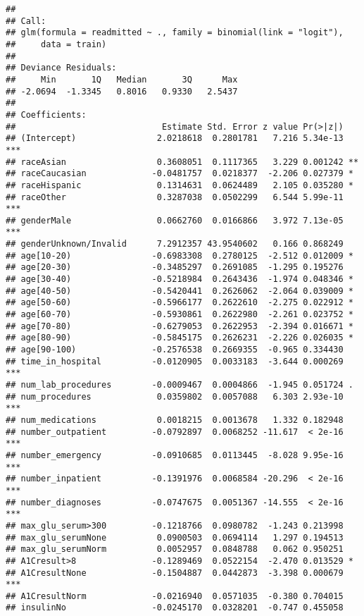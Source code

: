 \documentclass[]{article}
\begin{document}
\begin{verbatim}
## 
## Call:
## glm(formula = readmitted ~ ., family = binomial(link = "logit"), 
##     data = train)
## 
## Deviance Residuals: 
##     Min       1Q   Median       3Q      Max  
## -2.0694  -1.3345   0.8016   0.9330   2.5437  
## 
## Coefficients:
##                             Estimate Std. Error z value Pr(>|z|)    
## (Intercept)                2.0218618  0.2801781   7.216 5.34e-13 ***
## raceAsian                  0.3608051  0.1117365   3.229 0.001242 ** 
## raceCaucasian             -0.0481757  0.0218377  -2.206 0.027379 *  
## raceHispanic               0.1314631  0.0624489   2.105 0.035280 *  
## raceOther                  0.3287038  0.0502299   6.544 5.99e-11 ***
## genderMale                 0.0662760  0.0166866   3.972 7.13e-05 ***
## genderUnknown/Invalid      7.2912357 43.9540602   0.166 0.868249    
## age[10-20)                -0.6983308  0.2780125  -2.512 0.012009 *  
## age[20-30)                -0.3485297  0.2691085  -1.295 0.195276    
## age[30-40)                -0.5218984  0.2643436  -1.974 0.048346 *  
## age[40-50)                -0.5420441  0.2626062  -2.064 0.039009 *  
## age[50-60)                -0.5966177  0.2622610  -2.275 0.022912 *  
## age[60-70)                -0.5930861  0.2622980  -2.261 0.023752 *  
## age[70-80)                -0.6279053  0.2622953  -2.394 0.016671 *  
## age[80-90)                -0.5845175  0.2626231  -2.226 0.026035 *  
## age[90-100)               -0.2576538  0.2669355  -0.965 0.334430    
## time_in_hospital          -0.0120905  0.0033183  -3.644 0.000269 ***
## num_lab_procedures        -0.0009467  0.0004866  -1.945 0.051724 .  
## num_procedures             0.0359802  0.0057088   6.303 2.93e-10 ***
## num_medications            0.0018215  0.0013678   1.332 0.182948    
## number_outpatient         -0.0792897  0.0068252 -11.617  < 2e-16 ***
## number_emergency          -0.0910685  0.0113445  -8.028 9.95e-16 ***
## number_inpatient          -0.1391976  0.0068584 -20.296  < 2e-16 ***
## number_diagnoses          -0.0747675  0.0051367 -14.555  < 2e-16 ***
## max_glu_serum>300         -0.1218766  0.0980782  -1.243 0.213998    
## max_glu_serumNone          0.0900503  0.0694114   1.297 0.194513    
## max_glu_serumNorm          0.0052957  0.0848788   0.062 0.950251    
## A1Cresult>8               -0.1289469  0.0522154  -2.470 0.013529 *  
## A1CresultNone             -0.1504887  0.0442873  -3.398 0.000679 ***
## A1CresultNorm             -0.0216940  0.0571035  -0.380 0.704015    
## insulinNo                 -0.0245170  0.0328201  -0.747 0.455058    

\end{verbatim}
\end{document}
